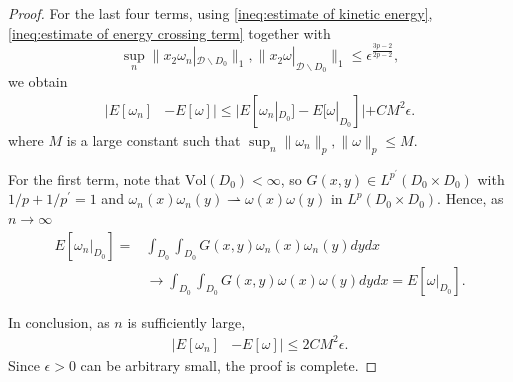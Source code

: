 \documentclass[10pt,a4paper]{amsart}
\renewcommand{\tt}[1]{\text{#1}}
\begin{document}
\begin{proof}
    For the last four terms, using \eqref{ineq:estimate of kinetic energy}, \eqref{ineq:estimate of energy crossing term} together with $$\sup_n\|x_2\omega_n|_{\mathcal{D}\backslash D_0}\|_1, \|x_2 \omega|_{\mathcal{D}\backslash D_0}\|_1\leq \epsilon^{\frac{3p-2}{2p-2}},$$ 
    we obtain
    \begin{align*}
        |E[\omega_n] & - E[\omega]| \leq |E[\omega_n|_{D_0}]-E[\omega|_{D_0}]| + C M^2\epsilon.
    \end{align*}
    where $M$ is a large constant such that $\sup_n\|\omega_n\|_{p}, \|\omega\|_{p}\leq M$.

    For the first term, note that $\tt{Vol}(D_0)<\infty$, so $G(x,y) \in L^{p^{\prime}}(D_0 \times D_0)$ with $1/p+1/{p^\prime}=1$ and $\omega_n(x)\omega_n(y) \rightharpoonup \omega(x)\omega(y)$ in $L^p(D_0 \times D_0)$. Hence, as $n\to\infty$
    \begin{align*}
        E[\omega_n|_{D_0}] = & \int_{D_0}\int_{D_0} {G}(x,y)\omega_n(x)\omega_n(y)dydx \\
        & \longrightarrow \int_{D_0}\int_{D_0} {G}(x,y)\omega(x)\omega(y)dydx = E[\omega|_{D_0}].
    \end{align*}

    In conclusion, as $n$ is sufficiently large, 
    \begin{align*}
        |E[\omega_n] & - E[\omega]| \leq 2CM^2\epsilon.
    \end{align*}
    Since $\epsilon>0$ can be arbitrary small, the proof is complete.
    
\end{proof}
\end{document}
